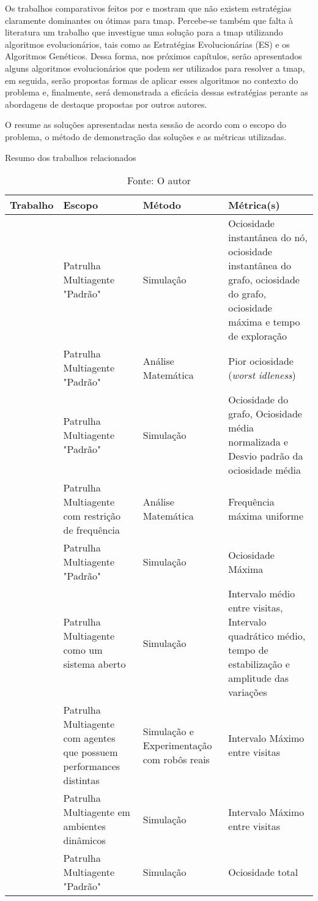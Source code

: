 Os trabalhos comparativos feitos por \citep{Almeida:2004:AAI} e 
\citep{sampaiophd} mostram que não existem estratégias claramente dominantes 
ou ótimas para \ac{tmap}. Percebe-se também que falta à literatura um trabalho 
que investigue uma solução para a \ac{tmap} utilizando algoritmos 
evolucionários, tais como as Estratégias Evolucionárias (ES) e os Algoritmos Genéticos. Dessa forma, nos próximos 
capítulos, serão apresentados alguns algoritmos evolucionários que podem ser 
utilizados para resolver a \ac{tmap}, em seguida, serão propostas formas de 
aplicar esses algoritmos no contexto do problema e, finalmente, será 
demonstrada a eficácia dessas estratégias perante as abordagens de destaque 
propostas por outros autores.

O  resume as soluções apresentadas nesta sessão de 
acordo com o escopo do problema, o método de demonstração das soluções e as 
métricas utilizadas.

\begin{table}[tp]
	\centering
	\caption{Resumo dos trabalhos relacionados}
	\label{tbl:comp_background}
	\begin{tabularx}{\linewidth}{|X|X|X|X|}
		\hline
		\textbf{Trabalho} & \textbf{Escopo} & \textbf{Método} & \textbf{Métrica(s)} \\
		\hline
		\citep{Machado:2002:MPE:1765317.1765332} & Patrulha Multiagente "Padrão" & Simulação & Ociosidade instantânea do nó, ociosidade instantânea do grafo, ociosidade do grafo, ociosidade máxima e tempo de exploração \\
		\hline
		\citep{Chevaleyre:2004:TAM:1018411.1019013} & Patrulha Multiagente "Padrão" & Análise Matemática & Pior ociosidade (\textit{worst idleness}) \\
		\hline
		\citep{Almeida:2004:AAI} & Patrulha Multiagente "Padrão" & Simulação & Ociosidade do grafo, Ociosidade média normalizada e Desvio padrão da ociosidade média \\
		\hline
		\citep{4209122} & Patrulha Multiagente com restrição de frequência & Análise Matemática & Frequência máxima uniforme \\
		\hline
		\citep{4630897} & Patrulha Multiagente "Padrão" & Simulação & Ociosidade Máxima \\
		\hline
		\citep{6495145} & Patrulha Multiagente como um sistema aberto & Simulação & Intervalo médio entre visitas, Intervalo quadrático médio, tempo de estabilização e amplitude das variações \\
		\hline
		\citep{Pippin:2013:PBT:2480362.2480378} & Patrulha Multiagente com agentes que possuem performances distintas & Simulação e Experimentação com robôs reais & Intervalo Máximo entre visitas \\
		\hline
		\citep{6615158} & Patrulha Multiagente em ambientes dinâmicos & Simulação & Intervalo Máximo entre visitas \\
		\hline
		\citep{hernandez2013game} & Patrulha Multiagente "Padrão" & Simulação & Ociosidade total \\
		\hline
	\end{tabularx}
	\caption*{Fonte: O autor}
\end{table}